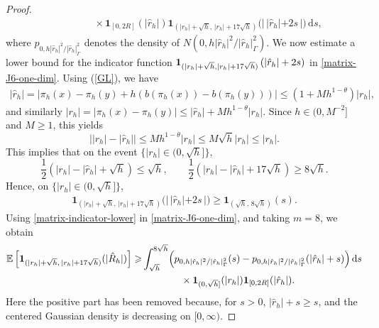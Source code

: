 \documentclass[aap]{imsart}
\theoremstyle{plain}
\theoremstyle{definition}
\begin{document}
\begin{proof}
\begin{equation}
\begin{aligned}
			&\qquad\qquad\times
			\mathbf 1_{[0,2R]}(|\hat r_h|)
			\mathbf 1_{(|r_h|+\sqrt h,\,|r_h|+17\sqrt h)}
			\bigl(|\,|\hat r_h|+2s\,|\bigr)
			\,\mathrm ds ,
		\end{aligned}
	\end{equation}
	where \(p_{0,h|\hat r_h|^2/|\hat r_h|_\Gamma^2}\) denotes the density of \(N(0,h|\hat r_h|^2/|\hat r_h|_\Gamma^2)\). We now estimate a lower bound for the indicator function ${\bf 1}_{(|r_h|+\sqrt{h}, |r_h|+17\sqrt{h})}\left(|\hat{r}_h|+2s\right)$ in \eqref{matrix-J6-one-dim}. Using (\ref{GL}), we have
	\begin{align*}
		|\hat{r}_h| = |\pi_h(x)-\pi_h(y)+h(b(\pi_h(x))-b(\pi_h(y)))|\leqslant (1+Mh^{1-\theta})|r_h|,
	\end{align*}
	and similarly \(|r_h|= |\pi_h(x)-\pi_h(y)|
	\leqslant |\hat{r}_h|+Mh^{1-\theta}|r_h|\).
	Since \(h\in(0,M^{-2}]\) and \(M\geqslant 1\), this yields 
	\begin{equation}\label{rr}
		\left||r_h|-|\hat{r}_h|\right|\leqslant Mh^{1-\theta}|r_h|\leqslant M\sqrt{h}|r_h|\leqslant |r_h|.
	\end{equation}
	This implies that on the event \(\{|r_h|\in(0,\sqrt h]\}\),  
	$$\frac{1}{2}\left(|r_h|-|\hat{r}_h|+\sqrt{h}\right)\leqslant\sqrt{h}, \qquad \frac{1}{2}\left(|r_h|-|\hat{r}_h|+17\sqrt{h}\right) \geqslant8\sqrt{h}.$$
	Hence, on \(\{|r_h|\in(0,\sqrt h]\}\),
	\begin{equation}\label{matrix-indicator-lower}
		\begin{aligned}
			\mathbf 1_{(|r_h|+\sqrt h,\,|r_h|+17\sqrt h)}
			\bigl(|\,|\hat r_h|+2s\,|\bigr)\geqslant
			\mathbf 1_{(\sqrt h,\,8\sqrt h)}(s).
		\end{aligned}
	\end{equation}	
	Using \eqref{matrix-indicator-lower} in \eqref{matrix-J6-one-dim}, and taking
	\(m=8\), we obtain
	\begin{equation}\label{matrix-J6-lower1}
		\begin{aligned}
			\mathbb E\left[
			\mathbf 1_{(|r_h|+\sqrt h,\,|r_h|+17\sqrt h)}
			(|\hat R_h|)
			\right]\geqslant&
			\int_{\sqrt h}^{8\sqrt h}
			\Bigl(
			p_{0,h|\hat r_h|^2/|\hat r_h|_\Gamma^2}(s)
			-
			p_{0,h|\hat r_h|^2/|\hat r_h|_\Gamma^2}(|\hat r_h|+s)
			\Bigr)
			\,\mathrm ds\\
			&\qquad\qquad \times
			\mathbf 1_{(0,\sqrt h]}(|r_h|)
			\mathbf 1_{[0,2R]}(|\hat r_h|).
		\end{aligned}
	\end{equation}
	Here the positive part has been removed because, for \(s>0\), \(|\hat r_h|+s\geqslant s\), and the centered Gaussian density is decreasing on \([0,\infty)\). 

\end{proof}
\end{document}
